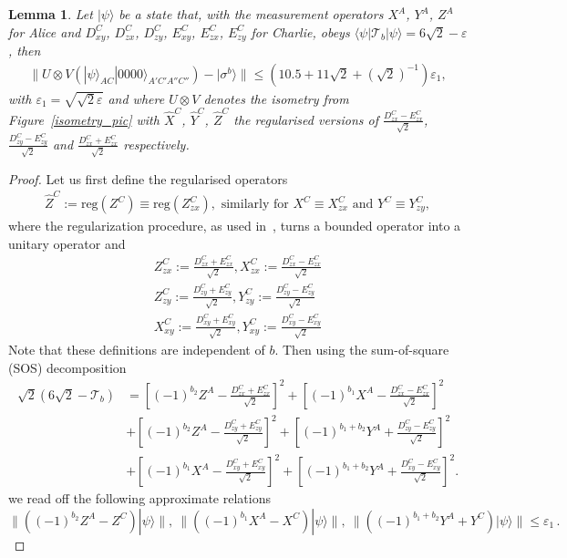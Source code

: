 \documentclass[onecolumn,prx,amsmath,amssymb]{revtex4-2}
\newtheorem{lem}{Lemma}
\def\bra#1{\langle#1|} \def\ket#1{|#1\rangle}
\def\norm#1{\| #1 \| }
\begin{document}
\begin{appendix}
\begin{lem} \label{lem1} Let  $\ket{\psi}$ be a state that, with the measurement operators $X^A$, $Y^A$, $Z^A$ for Alice and $D^C_{xy}$, $D^C_{zx}$, $D^C_{zy}$, $E^C_{xy}$, $E^C_{zx}$, $E^C_{zy}$ for Charlie, obeys $\bra{\psi}\mathscr{T}_b\ket{\psi}=6\sqrt{2}-\varepsilon$, then
\begin{align}
    \norm{U\otimes V\left(\ket{\psi}_{{AC}}\ket{0000}_{A'C'A''C''}\right) - \ket{\sigma^b}}  \leq  (10.5+11\sqrt{2}+(\sqrt{2})^{-1})\varepsilon_1,
    \label{eps2}
\end{align}
with $\varepsilon_1=\sqrt{\sqrt{2}\varepsilon}$ and where $U \otimes V$ denotes the isometry from Figure~\ref{isometry_pic} with $\hat{X}^C$, $\hat{Y}^C$, $\hat{Z}^C$ the regularised versions of $\frac{D^C_{zx}-E^C_{zx}}{\sqrt{2}}$, $\frac{D^C_{zy}-E^C_{zy}}{\sqrt{2}}$ and  $\frac{D^C_{zx}+E^C_{zx}}{\sqrt{2}}$ respectively.
\end{lem}


\begin{proof}
Let us first define the regularised operators
\begin{align}
    \hat Z^C := \text{reg}(Z^C) \equiv \text{reg}(Z^C_{zx}), \text{ similarly for } X^C \equiv X^C_{zx} \text{ and } Y^C\equiv Y^C_{zy},
\end{align}
where the regularization procedure, as used in~\cite{self_testing}, turns a bounded operator into a unitary operator and 
\begin{align}
    Z^C_{zx}:=\frac{D^C_{zx}+E^C_{zx}}{\sqrt{2}}, X^C_{zx}:=\frac{D^C_{zx}-E^C_{zx}}{\sqrt{2}}\\
    Z^C_{zy}:=\frac{D^C_{zy}+E^C_{zy}}{\sqrt{2}}, Y^C_{zy}:=\frac{D^C_{zy}-E^C_{zy}}{\sqrt{2}}\\
    X^C_{xy}:=\frac{D^C_{xy}+E^C_{xy}}{\sqrt{2}}, Y^C_{xy}:=\frac{D^C_{xy}-E^C_{xy}}{\sqrt{2}}
\end{align}
Note that these definitions are independent of $b$. Then using the sum-of-square (SOS) decomposition
\begin{align}
    \sqrt{2}(6\sqrt{2}-\mathscr{T}_b)&=\left[(-1)^{b_2}Z^A-\frac{D^C_{zx}+E^C_{zx}}{\sqrt{2}}\right]^2 + \left[(-1)^{b_1}X^A-\frac{D^C_{zx}-E^C_{zx}}{\sqrt{2}}\right]^2\\
    &+\left[(-1)^{b_2}Z^A-\frac{D^C_{zy}+E^C_{zy}}{\sqrt{2}}\right]^2 + \left[(-1)^{b_1+b_2}Y^A+\frac{D^C_{zy}-E^C_{zy}}{\sqrt{2}}\right]^2\\
    &+\left[(-1)^{b_1}X^A-\frac{D^C_{xy}+E^C_{xy}}{\sqrt{2}}\right]^2 + \left[(-1)^{b_1+b_2}Y^A+\frac{D^C_{xy}-E^C_{xy}}{\sqrt{2}}\right]^2.
\end{align}
we read off the following approximate relations
\begin{equation}\label{eq:CtoA}
\norm{((-1)^{b_2}Z^A-Z^C)\ket{\psi}}, \ \norm{((-1)^{b_1}X^A-X^C)\ket{\psi}}, \ \norm{((-1)^{b_1+b_2}Y^A+Y^C)\ket{\psi}} \leq \varepsilon_1\,.
\end{equation}


\end{proof}
\end{appendix}
\end{document}
